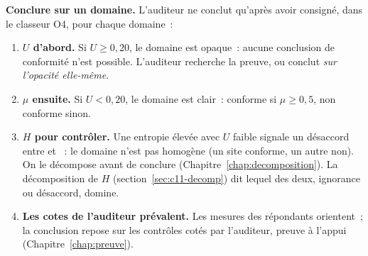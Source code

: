 \begin{boxprocedure}
\textbf{Conclure sur un domaine.} L'auditeur ne conclut qu'après avoir
consigné, dans le classeur O4, pour chaque domaine~:
\begin{enumerate}
    \item \textbf{$U$ d'abord.} Si $U \geq 0{,}20$, le domaine est opaque~:
          aucune conclusion de conformité n'est possible. L'auditeur
          recherche la preuve, ou conclut \emph{sur l'opacité elle-même}.
    \item \textbf{$\mu$ ensuite.} Si $U < 0{,}20$, le domaine est clair~:
          conforme si $\mu \geq 0{,}5$, non conforme sinon.
    \item \textbf{$H$ pour contrôler.} Une entropie élevée avec $U$ faible
          signale un désaccord entre \OUI{} et \NON{}~: le domaine n'est pas
          homogène (un site conforme, un autre non). On le décompose avant de
          conclure (Chapitre~\ref{chap:decomposition}). La décomposition de
          $H$ (section~\ref{sec:c11-decomp}) dit lequel des deux, ignorance
          ou désaccord, domine.
    \item \textbf{Les cotes de l'auditeur prévalent.} Les mesures des
          répondants orientent~; la conclusion repose sur les contrôles cotés
          par l'auditeur, preuve à l'appui (Chapitre~\ref{chap:preuve}).
\end{enumerate}
\end{boxprocedure}

